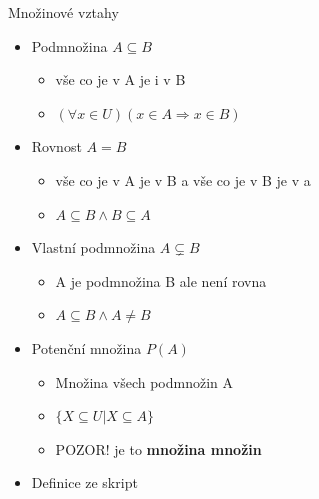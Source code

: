 \documentclass[aspectratio=1610]{beamer}
\begin{document}
\begin{frame}{Množinové vztahy}

\begin{itemize}
  \item Podmnožina $A \subseteq B$ \begin{itemize}
    \item<2-> vše co je v A je i v B
    \item<2-> $(\forall x \in \mathit{U})(x \in A \Rightarrow x \in B)$
  \end{itemize}
  \item Rovnost $A = B$ \begin{itemize}
    \item<3-> vše co je v A je v B a vše co je v B je v a
    \item<3-> $A \subseteq B \land B \subseteq A$
  \end{itemize}
  \item Vlastní podmnožina $A \varsubsetneq B$ \begin{itemize}
    \item<4-> A je podmnožina B ale není rovna
    \item<4-> $A \subseteq B \land A \neq B$
  \end{itemize}
  \item Potenční množina $\mathit{P}(A)$ \begin{itemize}
    \item<5-> Množina všech podmnožin A
    \item<5-> $\{X \subseteq \mathit{U}| X \subseteq A\}$
    \item<5-> POZOR! je to \textbf{množina množin}
  \end{itemize}
  \item \small{Definice ze skript\cite{courses:DMLsets}}
\end{itemize}

\end{frame}
\end{document}
